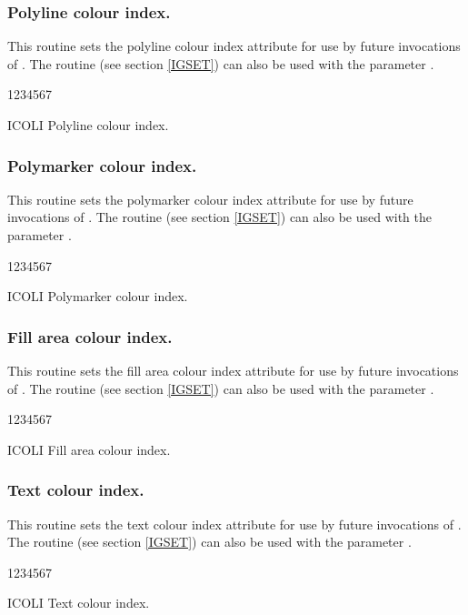 \subsubsection{Polyline colour index.}
\Action
This routine sets the polyline colour index attribute for use by future
invocations of . The routine  (see section \ref{IGSET})
can also be used with the parameter .
\Pdesc
\begin{DLtt}{1234567}
\item[ICOLI] Polyline colour index.
\end{DLtt}
%
\subsubsection{Polymarker colour index.}
\Action
This routine sets the polymarker colour index attribute for use by future
invocations of . The routine  (see section \ref{IGSET})
can also be used with the parameter .
\Pdesc
\begin{DLtt}{1234567}
\item[ICOLI] Polymarker colour index.
\end{DLtt}
%
\subsubsection{Fill area colour index.}
\Action
This routine sets the fill area colour index attribute for use by future
invocations of . The routine  (see section \ref{IGSET})
can also be used with the parameter .
\Pdesc
\begin{DLtt}{1234567}
\item[ICOLI] Fill area colour index.
\end{DLtt}
%
\clearpage
\subsubsection{Text colour index.}
\Action
This routine sets the text colour index attribute for use by future invocations
of . The routine  (see section \ref{IGSET}) can also be
used with the parameter .
\Pdesc
\begin{DLtt}{1234567}
\item[ICOLI]Text colour index.
\end{DLtt}
%
